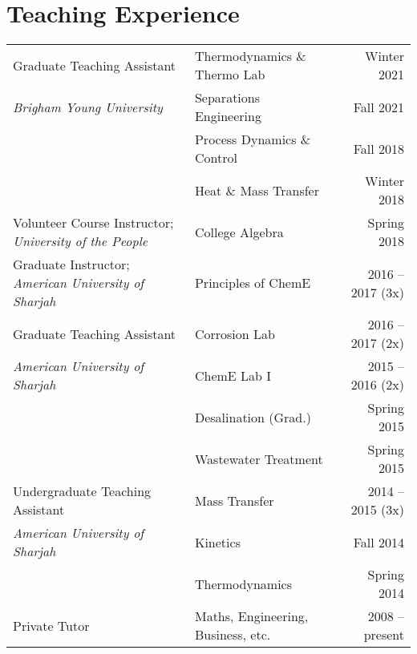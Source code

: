 \documentclass[letterpaper,11pt]{article}
\begin{document}
\section*{Teaching Experience}
\begin{tabular}{@{}p{}p{}r@{}}
     Graduate Teaching Assistant          & Thermodynamics \& Thermo Lab              & Winter 2021 \\
      \textit{Brigham Young University}   & Separations Engineering     & Fall 2021 \\
                                          & Process Dynamics \& Control & Fall 2018 \\
                                          & Heat \& Mass Transfer       & Winter 2018 \\[4pt]
     Volunteer Course Instructor; \textit{University of the People} & College Algebra           & Spring 2018 \\[4pt]
     Graduate Instructor; \textit{American University of Sharjah}   & Principles of ChemE       & 2016 -- 2017 (3x) \\[4pt]
     Graduate Teaching Assistant          & Corrosion Lab                                       & 2016 -- 2017 (2x) \\
     \textit{American University of Sharjah}                         
                                          & ChemE Lab I                                         & 2015 -- 2016 (2x) \\
                                          & Desalination (Grad.)                                & Spring 2015 \\
                                          & Wastewater Treatment                                & Spring 2015 \\[4pt]
     Undergraduate Teaching Assistant     & Mass Transfer                                       & 2014 -- 2015 (3x) \\
     \textit{American University of Sharjah}
                                          & Kinetics                                            & Fall 2014 \\
                                          & Thermodynamics                                      & Spring 2014 \\[4pt]
     Private Tutor                        & Maths, Engineering, Business, etc.                  & 2008 -- present
\end{tabular}
\end{document}
